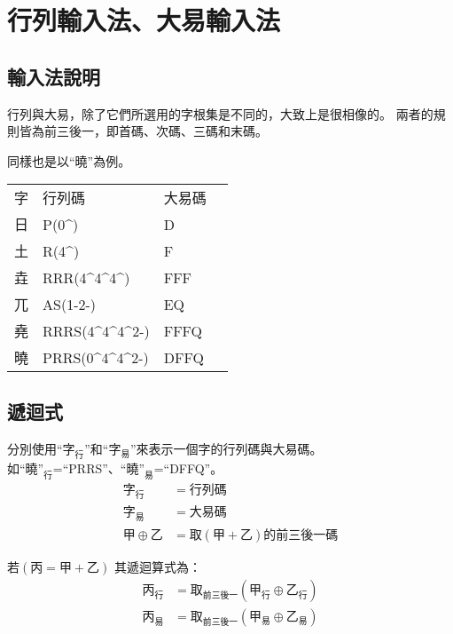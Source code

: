 \documentclass{article}
\def\tac{\textasciicircum}
\begin{document}
\section{行列輸入法、大易輸入法}
\subsection{輸入法說明}
行列與大易，除了它們所選用的字根集是不同的，大致上是很相像的。
兩者的規則皆為前三後一，即首碼、次碼、三碼和末碼。

同樣也是以``曉''為例。\\
\begin{tabular}{llll}
字  & 行列碼 & 大易碼\\
日  & P(0\tac) & D\\
土  & R(4\tac) & F\\
垚  & RRR(4\tac4\tac4\tac) & FFF\\
兀  & AS(1-2-) & EQ\\
堯  & RRRS(4\tac4\tac4\tac2-) & FFFQ\\
曉  & PRRS(0\tac4\tac4\tac2-) & DFFQ\\
\end{tabular}

\subsection{遞迴式}
分別使用``$\mbox{字}_{\mbox{行}}$''和``$\mbox{字}_{\mbox{易}}$''來表示一個字的行列碼與大易碼。\\
如$\mbox{``曉''}_{\mbox{行}}$=``PRRS''、$\mbox{``曉''}_{\mbox{易}}$=``DFFQ''。
\begin{subequations}
  \begin{align}
  \mbox{字}_{\mbox{行}} &= 行列碼\\
  \mbox{字}_{\mbox{易}} &= 大易碼\\
  甲 \oplus 乙 &= 取(甲+乙)的前三後一碼
  \end{align}
\end{subequations}

若$(\mbox{丙}=\mbox{甲}+\mbox{乙})$
其遞迴算式為：
\begin{subequations}
  \begin{align}
  \mbox{丙}_{\mbox{行}}&=\mbox{取}_{\mbox{前三後一}}(\mbox{甲}_{\mbox{行}} \oplus \mbox{乙}_{\mbox{行}})\\
  \mbox{丙}_{\mbox{易}}&=\mbox{取}_{\mbox{前三後一}}(\mbox{甲}_{\mbox{易}} \oplus \mbox{乙}_{\mbox{易}})
  \end{align}
\end{subequations}
\end{document}
